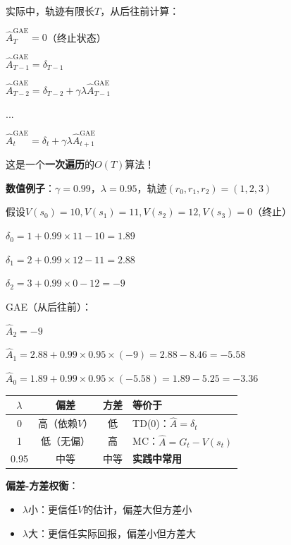 \documentclass[11pt,a4paper]{article}
\theoremstyle{definition}
\begin{document}
\begin{calculation}[GAE的数值计算]
实际中，轨迹有限长$T$，从后往前计算：

$\hat{A}^{\text{GAE}}_T = 0$（终止状态）

$\hat{A}^{\text{GAE}}_{T-1} = \delta_{T-1}$

$\hat{A}^{\text{GAE}}_{T-2} = \delta_{T-2} + \gamma\lambda \hat{A}^{\text{GAE}}_{T-1}$

...

$\hat{A}^{\text{GAE}}_t = \delta_t + \gamma\lambda \hat{A}^{\text{GAE}}_{t+1}$

这是一个\textbf{一次遍历}的$O(T)$算法！

\textbf{数值例子}：$\gamma = 0.99$，$\lambda = 0.95$，轨迹$(r_0, r_1, r_2) = (1, 2, 3)$

假设$V(s_0) = 10, V(s_1) = 11, V(s_2) = 12, V(s_3) = 0$（终止）

$\delta_0 = 1 + 0.99 \times 11 - 10 = 1.89$

$\delta_1 = 2 + 0.99 \times 12 - 11 = 2.88$

$\delta_2 = 3 + 0.99 \times 0 - 12 = -9$

GAE（从后往前）：

$\hat{A}_2 = -9$

$\hat{A}_1 = 2.88 + 0.99 \times 0.95 \times (-9) = 2.88 - 8.46 = -5.58$

$\hat{A}_0 = 1.89 + 0.99 \times 0.95 \times (-5.58) = 1.89 - 5.25 = -3.36$
\end{calculation}

\begin{keypoint}
\begin{center}
\begin{tabular}{c|c|c|l}
\toprule
$\lambda$ & 偏差 & 方差 & 等价于 \\
\midrule
0 & 高（依赖$V$） & 低 & TD(0)：$\hat{A} = \delta_t$ \\
1 & 低（无偏） & 高 & MC：$\hat{A} = G_t - V(s_t)$ \\
0.95 & 中等 & 中等 & \textbf{实践中常用} \\
\bottomrule
\end{tabular}
\end{center}

\textbf{偏差-方差权衡}：
\begin{itemize}
    \item $\lambda$小：更信任$V$的估计，偏差大但方差小
    \item $\lambda$大：更信任实际回报，偏差小但方差大
\end{itemize}
\end{keypoint}
\end{document}
